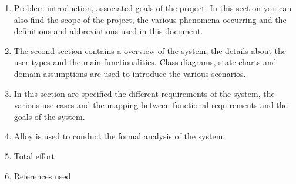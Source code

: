 \begin{enumerate}
	\item Problem introduction, associated goals of the project. In this section you can also find the scope of the project, the various phenomena occurring and the definitions and abbreviations used in this document.
	\item The second section contains a overview of the system, the details about the user types and the main functionalities. Class diagrams, state-charts and domain assumptions are used to introduce the various scenarios.
	\item In this section are specified the different requirements of the system, the various use cases and the mapping between functional requirements and the goals of the system.
	\item Alloy is used to conduct the formal analysis of the system.
	\item Total effort
	\item References used
\end{enumerate}






















